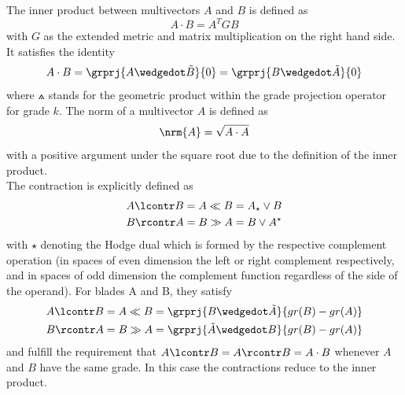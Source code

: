 The inner product between multivectors $A$ and $B$ is defined as
\begin{equation}
    A \cdot B = A^{T} G B
    \label{eg:inner_product_metric}
\end{equation}
with $G$ as the extended metric and matrix multiplication on the right hand side. It
satisfies the identity
\begin{equation}
    A \cdot B  = \grprj{A \wedgedot \tilde{B}}{0} = \grprj{ B \wedgedot \tilde{A} }{0}
    \label{eq:inner_product_link_to_gpr}
\end{equation}
where $\wedgedot$ stands for the geometric product within the grade projection operator
 for grade $k$. The norm of a multivector $A$ is defined as
\begin{equation}
    \nrm{A} = \sqrt{A \cdot A}
    \label{eq:norm_mv}
\end{equation}
with a positive argument under the square root due to the definition of the inner product.
\\

The contraction is explicitly defined as
\begin{subequations}
    \begin{align}
    A \lcontr B & = A \ll B = A_{\star} \vee B
    \label{eq:lcontr} \\
    B \rcontr A & = B \gg A = B \vee A^{\star}
    \label{eq:rcontr}
    \end{align}
\end{subequations}
with $\star$ denoting the Hodge dual which is formed by the respective complement
operation (in spaces of even dimension the left or right complement respectively, and in
spaces of odd dimension the complement function regardless of the side of the operand).
For blades A and B, they satisfy
\begin{subequations}
    \begin{align}
    A \lcontr B &  = A \ll B = \grprj{B \wedgedot \tilde{A}}{gr(B)-gr(A)}
    \label{eq:lcontr_gpr} \\
    B \rcontr A & = B \gg A = \grprj{\tilde{A} \wedgedot B}{gr(B)-gr(A)}
    \label{eq:rcontr_gpr}
    \end{align}
\end{subequations}
and fulfill the requirement that $A \lcontr B = A \rcontr B = A \cdot B$ whenever $A$
and $B$ have the same grade. In this case the contractions reduce to the inner product. \\


